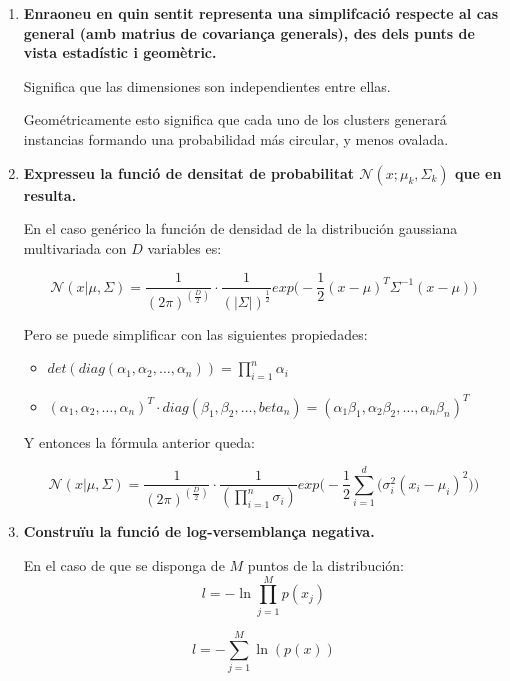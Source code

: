 \documentclass[a5paper]{article}
\begin{document}
\begin{enumerate}
\item \textbf{Enraoneu en quin sentit representa una simplifcació respecte al cas general (amb matrius de
covariança generals), des dels punts de vista estadístic i geomètric.
}

Significa que las dimensiones son independientes entre ellas.

Geométricamente esto significa que cada uno de los clusters generará instancias formando una probabilidad más circular, y menos ovalada.
\item \textbf{Expresseu la funció de densitat de probabilitat $\mathcal{N}(x; \mu_k, \Sigma_k)$ que en resulta.
}

En el caso genérico la función de densidad de la distribución gaussiana multivariada con $D$ variables es:

\begin{equation*}
\mathcal{N}(x|\mu,\Sigma) = \frac{1}{(2\pi)^{(\frac{D}{2})}} \cdot \frac{1}{(|\Sigma|)^{\frac{1}{2}}} exp\Bigg( -\frac{1}{2} (x - \mu)^T\Sigma^{-1}(x - \mu) \Bigg)
\end{equation*}

Pero se puede simplificar con las siguientes propiedades:
\begin{itemize}
\item $det( diag(\alpha_1,\alpha_2, \dots, \alpha_n) ) = \prod_{i = 1}^n \alpha_i$
\item $(\alpha_1,\alpha_2, \dots, \alpha_n)^T \cdot diag(\beta_1,\beta_2, \dots, beta_n) = (\alpha_1\beta_1, \alpha_2\beta_2, \dots, \alpha_n\beta_n)^T$
\end{itemize}

Y entonces la fórmula anterior queda:

\begin{equation*}
\mathcal{N}(x|\mu,\Sigma) = \frac{1}{(2\pi)^{(\frac{D}{2})}} \cdot \frac{1}{(\prod_{i = 1}^n \sigma_i)} exp\Bigg( -\frac{1}{2} \sum_{i = 1}^{d} \Big( \sigma_i^2(x_i - \mu_i)^2 \Big) \Bigg)
\end{equation*}
\item \textbf{Construïu la funció de log-versemblança negativa.
}

En el caso de que se disponga de $M$ puntos de la distribución:
\begin{equation*}
l = -\ln \prod_{j = 1}^{M} p(x_j) 
\end{equation*}

\begin{equation*}
l = -\sum_{j = 1}^{M} \ln(p(x)) 
\end{equation*}


\end{enumerate}
\end{document}
